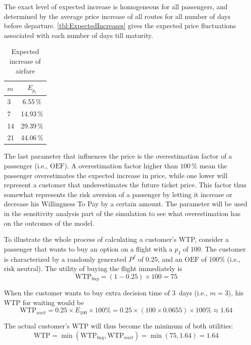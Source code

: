 The exact level of expected increase is homogeneous for all passengers, and determined by the average price increase of all routes for all number of days before departure. \autoref{tbl:ExpectedIncreases} gives the expected price fluctuations associated with each number of days till maturity.


\begin{table}
\centering
\footnotesize
\begin{tabular}{l c}
    \toprule
    $m$       &  $E_{p_t}$ \\
    \midrule
    3         &   6.55\,\%  \\
    7         &  14.93\,\% \\
    14        &  29.39\,\% \\
    21        &  44.06\,\% \\
    \bottomrule
\end{tabular}
\caption{Expected increase of airfare}
\label{tbl:ExpectedIncreases}
\end{table}


The last parameter that influences the price is the overestimation factor of a passenger (i.e., $\mbox{OEF}$). A overestimation factor higher than $100\,\%$ mean the passenger overestimates the expected increase in price, while one lower will represent a customer that underestimates the future ticket price. This factor thus somewhat represents the risk aversion of a passenger by letting it increase or decrease his Willingness To Pay by a certain amount. The parameter will be used in the sensitivity analysis part of the simulation to see what overestimation has on the outcomes of the model.


To illustrate the whole process of calculating a customer's WTP, consider a passenger that wants to buy an option on a flight with a $p_I$ of $100$. The customer is characterized by a randomly generated $P^f$ of $0.25$, and an $\mbox{OEF}$ of $100\%$ (i.e., risk neutral). The utility of buying the flight immediately is 
$$\mbox{WTP}_{buy} = (1 - 0.25) \times 100 = 75$$

When the customer wants to buy extra decision time of 3~days (i.e., $m = 3$), his WTP for waiting would be
$$\mbox{WTP}_{wait} = 0.25 \times E_{100} \times 100\% = 0.25 \times (100 \times 0.0655) \times 100\% \approx 1.64$$

The actual customer's $\mbox{WTP}$ will thus become the minimum of both utilities:
$$\mbox{WTP} = \min(\mbox{WTP}_{buy}, \mbox{WTP}_{wait}) = \min(75, 1.64) = 1.64$$


